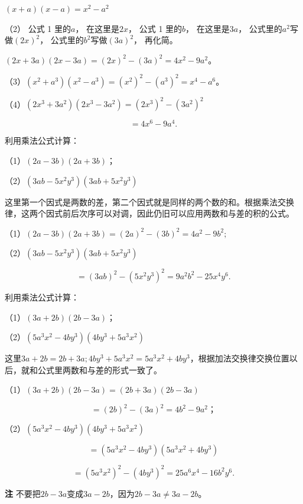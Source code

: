 \((x + a)(x - a) = x^{2} - a^{2}\)

 （2） 公式 1 里的\(a\)， 在这里是\(2x\)， 公式 1
里的\(b\)， 在这里是\(3a\)， 公式里的\(a^2\)写做\((2x)^2\)，
公式里的\(b^2\)写做\((3a)^2\)， 再化简。

\((2x + 3a)(2x - 3a) = (2x)^{2} - (3a)^{2} = 4x^{2} - 9a^{2}\)。

（3）\((x^{2} + a^{3})(x^{2} - a^{3}) = (x^{2})^{2} - (a^{3})^{2} = x^{4} - a^{6}\)。

（4）\((2x^{3} + 3a^{2})(2x^{3} - 3a^{2}) = (2x^{3})^{2} - (3a^{2})^{2}\)

\[
= 4 x ^{6} - 9 a ^{4}.
\]

 利用乘法公式计算：

（1）\((2a - 3b)(2a + 3b)\)；

（2）\((3ab - 5x^{2}y^{3})(3ab + 5x^{2}y^{3})\)

这里第一个因式是两数的差，第二个因式就是同样的两个数的和。根据乘法交换律，这两个因式前后次序可以对调，因此仍旧可以应用两数和与差的积的公式。

（1）\((2a - 3b)(2a + 3b) = (2a)^2 - (3b)^2 = 4a^2 - 9b^2;\)

（2）\((3ab - 5x^{2}y^{3})(3ab + 5x^{2}y^{3})\)

\[
= (3 a b) ^{2} - (5 x ^{2} y ^{3}) ^{2} = 9 a ^{2} b ^{2} - 25 x ^{4} y ^{6}.
\]

 利用乘法公式计算：

（1）\((3a + 2b)(2b - 3a)\)；

（2）\((5a^{3}x^{2} - 4by^{3})(4by^{3} + 5a^{3}x^{2})\)

这里\(3a + 2b = 2b + 3a; 4by^3 + 5a^3x^2 = 5a^3x^2 + 4by^3\)，根据加法交换律交换位置以后，就和公式里两数和与差的形式一致了。

 （1）\((3a + 2b)(2b - 3a) = (2b + 3a)(2b - 3a)\)

\[
= (2 b) ^{2} - (3 a) ^{2} = 4 b ^{2} - 9 a ^{2}\text{；}
\]

（2）\((5a^{3}x^{2} - 4by^{3})(4by^{3} + 5a^{3}x^{2})\)

\[
= (5 a ^{3} x ^{2} - 4 b y ^{3}) (5 a ^{3} x ^{2} + 4 b y ^{3})
\]

\[
= (5 a ^{3} x ^{2}) ^{2} - (4 b y ^{3}) ^{2} = 25 a ^{6} x ^{4} - 16 b ^{2} y ^{6}.
\]

\textbf{注}
不要把\(2b - 3a\)变成\(3a - 2b\)，因为\(2b - 3a \neq 3a - 2b\)。

